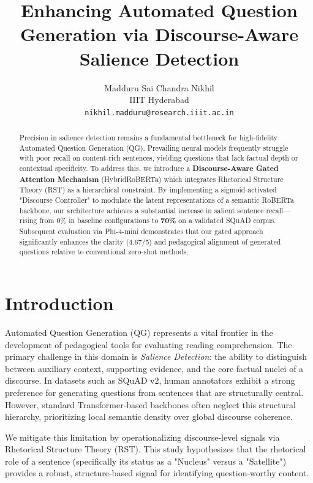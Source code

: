 \documentclass[11pt,a4paper]{article}
\title{\textbf{Enhancing Automated Question Generation via Discourse-Aware Salience Detection}}
\author{
  Madduru Sai Chandra Nikhil \\
  IIIT Hyderabad \\
  \texttt{nikhil.madduru@research.iiit.ac.in}
}
\begin{document}
\maketitle

\let\thefootnote\relax{}

\begin{abstract}
Precision in salience detection remains a fundamental bottleneck for high-fidelity Automated Question Generation (QG). Prevailing neural models frequently struggle with poor recall on content-rich sentences, yielding questions that lack factual depth or contextual specificity. To address this, we introduce a \textbf{Discourse-Aware Gated Attention Mechanism} (HybridRoBERTa) which integrates Rhetorical Structure Theory (RST) as a hierarchical constraint. By implementing a sigmoid-activated "Discourse Controller" to modulate the latent representations of a semantic RoBERTa backbone, our architecture achieves a substantial increase in salient sentence recall—rising from 0\% in baseline configurations to \textbf{70\%} on a validated SQuAD corpus. Subsequent evaluation via Phi-4-mini demonstrates that our gated approach significantly enhances the clarity (4.67/5) and pedagogical alignment of generated questions relative to conventional zero-shot methods.
\end{abstract}

\section{Introduction}
Automated Question Generation (QG) represents a vital frontier in the development of pedagogical tools for evaluating reading comprehension. The primary challenge in this domain is \textit{Salience Detection}: the ability to distinguish between auxiliary context, supporting evidence, and the core factual nuclei of a discourse. In datasets such as SQuAD v2, human annotators exhibit a strong preference for generating questions from sentences that are structurally central. However, standard Transformer-based backbones often neglect this structural hierarchy, prioritizing local semantic density over global discourse coherence.

We mitigate this limitation by operationalizing discourse-level signals via Rhetorical Structure Theory (RST). This study hypothesizes that the rhetorical role of a sentence (specifically its status as a "Nucleus" versus a "Satellite") provides a robust, structure-based signal for identifying question-worthy content.
\end{document}
